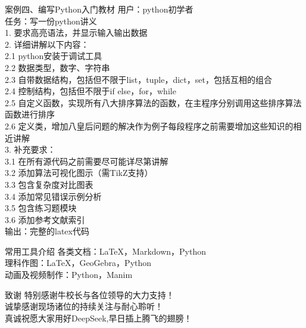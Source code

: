 \documentclass{ctexbeamer}
\begin{document}
\begin{frame}[t]{案例四、编写Python入门教材}
\fontsize{9pt}{11pt}\selectfont
\alert{用户：python初学者}\\
\alert{任务：写一份python讲义}\\
1. 要求高亮语法，并显示输入输出数据\\
2. 详细讲解以下内容：\\
2.1 python安装于调试工具\\
2.2 数据类型，数字、字符串\\
2.3 自带数据结构，包括但不限于list，tuple，dict，set，包括互相的组合\\
2.4 控制结构，包括但不限于if else，for，while\\
2.5 自定义函数，实现所有八大排序算法的函数，在主程序分别调用这些排序算法函数进行排序\\
2.6 定义类，增加八皇后问题的解决作为例子每段程序之前需要增加这些知识的相近讲解\\
3. 补充要求：\\
3.1 在所有源代码之前需要尽可能详尽第讲解\\
3.2 添加算法可视化图示（需TikZ支持）\\
3.3 包含复杂度对比图表\\
3.4 添加常见错误示例分析\\
3.5 包含练习题模块\\
3.6 添加参考文献索引\\
\alert{输出：完整的latex代码}
\end{frame}

\begin{frame}[t]{常用工具介绍}
\fontsize{14pt}{18pt}\selectfont
各类文档：LaTeX，Markdown，Python \\
理科作图：LaTeX，GeoGebra，Python \\
动画及视频制作：Python，Manim \\
\end{frame}

\begin{frame}[t]{致谢}
\centering
\fontsize{14pt}{18pt}\selectfont
\vspace*{1.6cm}
特别感谢牛校长与各位领导的大力支持！\\
\vspace*{0.4cm}
诚挚感谢现场诸位的持续关注与耐心聆听！\\
\vspace*{0.4cm}
真诚祝愿大家用好DeepSeek,早日插上腾飞的翅膀！
\end{frame}
\end{document}
